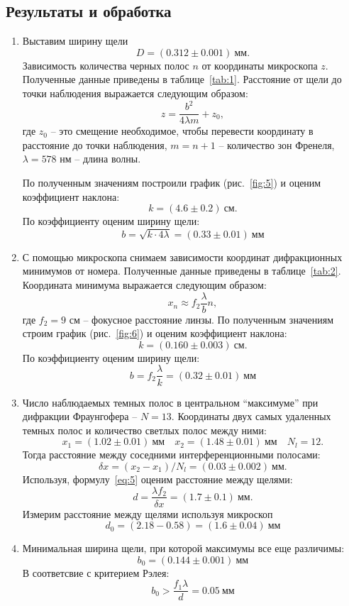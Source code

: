 \documentclass[12pt]{article}
\begin{document}
    \subsection*{Результаты и обработка}
    \begin{enumerate}
        \item Выставим ширину щели
        \[
            D = (0.312 \pm 0.001)\ \text{мм}.
        \]
        Зависимость количества черных полос $n$ от координаты микроскопа $z$.
        Полученные данные приведены в таблице\ \ref{tab:1}.
        Расстояние от щели до точки наблюдения выражается следующим образом:
        \[
            z = \frac{b^2}{4\lambda m} + z_0,
        \]
        где $z_0$ -- это смещение необходимое, чтобы перевести координату в расстояние до точки наблюдения,
        $m = n + 1$ -- количество зон Френеля, $\lambda = 578$ нм -- длина волны.

        По полученным значениям построили график (рис.\ \ref{fig:5}) и оценим коэффициент наклона:
        \[
            k = (4.6 \pm 0.2)\ \text{см}.
        \]
        По коэффициенту оценим ширину щели:
        \[
            b = \sqrt{k \cdot 4 \lambda} = (0.33 \pm 0.01)\ \text{мм}
        \]

        \item С помощью микроскопа снимаем зависимости координат дифракционных минимумов от номера.
        Полученные данные приведены в таблице\ \ref{tab:2}.
        Координата минимума выражается следующим образом:
        \[
            x_n \approx f_2\frac{\lambda}{b}n,
        \]
        где $f_2=9$ см -- фокусное расстояние линзы.
        По полученным значениям строим график (рис.\ \ref{fig:6}) и оценим коэффициент наклона:
        \[
            k = (0.160 \pm 0.003)\ \text{см}.
        \]
        По коэффициенту оценим ширину щели:
        \[
            b = f_2 \frac{\lambda}{k} = (0.32 \pm 0.01)\ \text{мм}
        \]

        \item Число наблюдаемых темных полос в центральном ``максимуме'' при дифракции Фраунгофера --  $N = 13$.
        Координаты двух самых удаленных темных полос и количество светлых полос между ними:
        \[
            x_1 = (1.02 \pm 0.01)\ \text{мм} \quad x_2 = (1.48 \pm 0.01)\ \text{мм} \quad N_l = 12.
        \]
        Тогда расстояние между соседними интерференционными полосами:
        \[
            \delta x = (x_2 - x_1) / N_l =(0.03 \pm 0.002)\ \text{мм}.
        \]
        Используя, формулу\ \ref{eq:5} оценим расстояние между щелями:
        \[
            d = \frac{\lambda f_2}{\delta x} = (1.7 \pm 0.1)\ \text{мм}.
        \]
        Измерим расстояние между щелями используя микроскоп
        \[
            d_0 = (2.18  - 0.58) = (1.6 \pm 0.04)\ \text{мм}
        \]
        \item Минимальная ширина щели, при которой максимумы все еще различимы:
        \[
            b_0 = (0.144\pm0.001)\ \text{мм}
        \]
        В соответсвие с критерием Рэлея:
        \[
            b_0 > \frac{f_1 \lambda}{d} = 0.05\ \text{мм}
        \]
    \end{enumerate}
\end{document}
